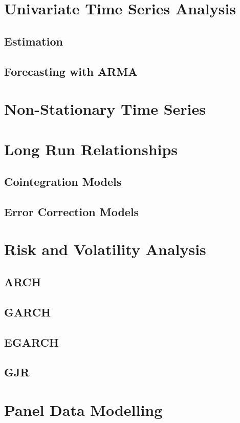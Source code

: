 \documentclass[a4paper]{article}
\begin{document}
\section{Univariate Time Series Analysis}
\subsection{Estimation}
\subsection{Forecasting with ARMA}

\section{Non-Stationary Time Series}

\section{Long Run Relationships}
\subsection{Cointegration Models}
\subsection{Error Correction Models}

\section{Risk and Volatility Analysis}
\subsection{ARCH}
\subsection{GARCH}
\subsection{EGARCH}
\subsection{GJR}

\section{Panel Data Modelling}
\end{document}
